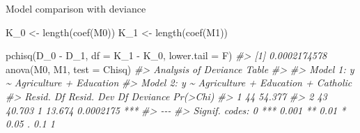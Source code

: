 \documentclass[
  10pt,
  ignorenonframetext,
]{beamer}
\newenvironment{Shaded}{\begin{snugshade}}{\end{snugshade}}
\newcommand{\AttributeTok}[1]{\textcolor[rgb]{0.77,0.63,0.00}{#1}}
\newcommand{\CommentTok}[1]{\textcolor[rgb]{0.56,0.35,0.01}{\textit{#1}}}
\newcommand{\FunctionTok}[1]{\textcolor[rgb]{0.00,0.00,0.00}{#1}}
\newcommand{\NormalTok}[1]{#1}
\newcommand{\OtherTok}[1]{\textcolor[rgb]{0.56,0.35,0.01}{#1}}
\newcommand{\SpecialCharTok}[1]{\textcolor[rgb]{0.00,0.00,0.00}{#1}}
\newcommand{\StringTok}[1]{\textcolor[rgb]{0.31,0.60,0.02}{#1}}
\begin{document}
\begin{frame}[fragile]{Model comparison with deviance}
\protect\hypertarget{model-comparison-with-deviance-1}{}
\begin{Shaded}
\begin{Highlighting}[]
\NormalTok{K\_0 }\OtherTok{\textless{}{-}} \FunctionTok{length}\NormalTok{(}\FunctionTok{coef}\NormalTok{(M0))}
\NormalTok{K\_1 }\OtherTok{\textless{}{-}} \FunctionTok{length}\NormalTok{(}\FunctionTok{coef}\NormalTok{(M1))}

\FunctionTok{pchisq}\NormalTok{(D\_0 }\SpecialCharTok{{-}}\NormalTok{ D\_1, }
       \AttributeTok{df =}\NormalTok{ K\_1 }\SpecialCharTok{{-}}\NormalTok{ K\_0,}
       \AttributeTok{lower.tail =}\NormalTok{ F)}
\CommentTok{\#\textgreater{} [1] 0.0002174578}
\FunctionTok{anova}\NormalTok{(M0, M1, }\AttributeTok{test =} \StringTok{\textquotesingle{}Chisq\textquotesingle{}}\NormalTok{)}
\CommentTok{\#\textgreater{} Analysis of Deviance Table}
\CommentTok{\#\textgreater{} }
\CommentTok{\#\textgreater{} Model 1: y \textasciitilde{} Agriculture + Education}
\CommentTok{\#\textgreater{} Model 2: y \textasciitilde{} Agriculture + Education + Catholic}
\CommentTok{\#\textgreater{}   Resid. Df Resid. Dev Df Deviance  Pr(\textgreater{}Chi)    }
\CommentTok{\#\textgreater{} 1        44     54.377                          }
\CommentTok{\#\textgreater{} 2        43     40.703  1   13.674 0.0002175 ***}
\CommentTok{\#\textgreater{} {-}{-}{-}}
\CommentTok{\#\textgreater{} Signif. codes:  0 \textquotesingle{}***\textquotesingle{} 0.001 \textquotesingle{}**\textquotesingle{} 0.01 \textquotesingle{}*\textquotesingle{} 0.05 \textquotesingle{}.\textquotesingle{} 0.1 \textquotesingle{} \textquotesingle{} 1}
\end{Highlighting}
\end{Shaded}
\end{frame}
\end{document}
